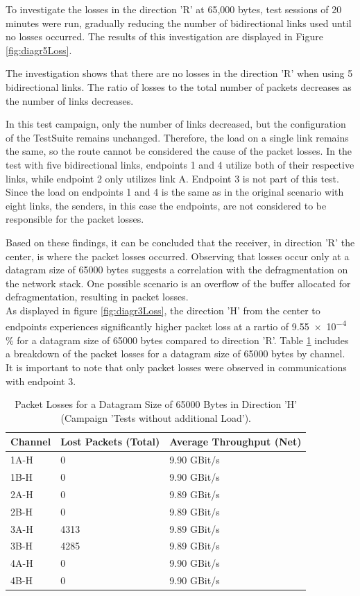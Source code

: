 To investigate the losses in the direction 'R' at 65,000 bytes, test sessions of 20 minutes were run, gradually reducing the number of bidirectional links used until no losses occurred. The results of this investigation are displayed in Figure \ref{fig:diagr5Loss}.

The investigation shows that there are no losses in the direction 'R' when using 5 bidirectional links. The ratio of losses to the total number of packets decreases as the number of links decreases.

In this test campaign, only the number of links decreased, but the configuration of the TestSuite remains unchanged. Therefore, the load on a single link remains the same, so the route cannot be considered the cause of the packet losses. In the test with five bidirectional links, endpoints 1 and 4 utilize both of their respective links, while endpoint 2 only utilizes link A. Endpoint 3 is not part of this test. Since the load on endpoints 1 and 4 is the same as in the original scenario with eight links, the senders, in this case the endpoints, are not considered to be responsible for the packet losses.

Based on these findings, it can be concluded that the receiver, in direction 'R' the center, is where the packet losses occurred. Observing that losses occur only at a datagram size of 65000 bytes suggests a correlation with the defragmentation on the network stack. One possible scenario is an overflow of the buffer allocated for defragmentation, resulting in packet losses. \\


As displayed in figure \ref{fig:diagr3Loss}, the direction 'H' from the center to endpoints experiences significantly higher packet loss at a rartio of \num{9.55e-4} \% for a datagram size of 65000 bytes compared to direction 'R'. Table \ref{tab:dirHLoss} includes a breakdown of the packet losses for a datagram size of 65000 bytes by channel. It is important to note that only packet losses were observed in communications with endpoint 3.

\begin{table}[h]
\centering
\begin{tabular}{lll}
	\toprule
	Channel & Lost Packets (Total) & Average Throughput (Net) \\
	\midrule
 	1A-H & 0    & 9.90 GBit/s \\ 
 	1B-H & 0    & 9.90 GBit/s \\
 	2A-H & 0    & 9.89 GBit/s \\
 	2B-H & 0    & 9.89 GBit/s \\
 	3A-H & 4313 & 9.89 GBit/s \\
 	3B-H & 4285 & 9.89 GBit/s \\
 	4A-H & 0    & 9.90 GBit/s \\
 	4B-H & 0    & 9.90 GBit/s \\
	\bottomrule
\end{tabular}
\caption{Packet Losses for a Datagram Size of 65000 Bytes in Direction 'H' (Campaign 'Tests without additional Load').}
\label{tab:dirHLoss}
\end{table}

